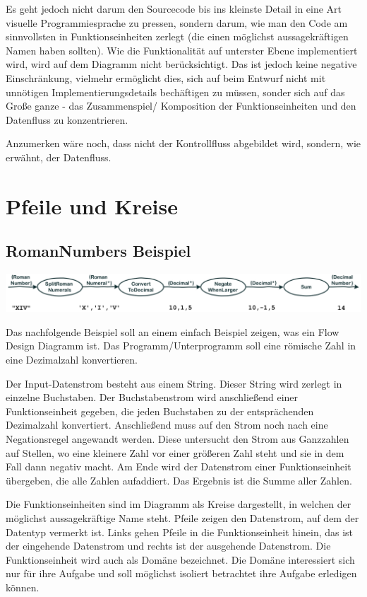 \documentclass[11pt]{article}
\begin{document}
Es geht jedoch nicht darum den Sourcecode bis ins kleinste Detail in eine Art visuelle Programmiesprache zu pressen,
sondern darum, wie man den Code am sinnvollsten in Funktionseinheiten zerlegt (die einen möglichst aussagekräftigen Namen haben sollten).
Wie die Funktionalität auf unterster Ebene implementiert wird, wird auf dem Diagramm nicht berücksichtigt.
Das ist jedoch keine negative Einschränkung, vielmehr ermöglicht dies, sich auf beim Entwurf nicht mit unnötigen Implementierungsdetails bechäftigen zu
müssen, sonder sich auf das Große ganze - das Zusammenspiel/ Komposition der Funktionseinheiten und den Datenfluss zu konzentrieren.

Anzumerken wäre noch, dass nicht der Kontrollfluss abgebildet wird, sondern, wie erwähnt, der Datenfluss.

\section{Pfeile und Kreise}
\label{sec:orgheadline4}
\subsection{RomanNumbers Beispiel}
\label{sec:orgheadline2}

\includegraphics[width=.9\linewidth]{./img/FromRomanNumerals.png}

Das nachfolgende Beispiel soll an einem einfach Beispiel zeigen, was ein Flow Design Diagramm ist.
Das Programm/Unterprogramm soll eine römische Zahl in eine Dezimalzahl konvertieren.

Der Input-Datenstrom besteht aus einem String. Dieser String wird zerlegt in einzelne Buchstaben.
Der Buchstabenstrom wird anschließend einer Funktionseinheit gegeben, die jeden Buchstaben zu der entsprächenden 
Dezimalzahl konvertiert. Anschließend muss auf den Strom noch nach eine Negationsregel angewandt werden. Diese untersucht den
Strom aus Ganzzahlen auf Stellen, wo eine kleinere Zahl vor einer größeren Zahl steht und sie in dem Fall dann negativ macht.
Am Ende wird der Datenstrom einer Funktionseinheit übergeben, die alle Zahlen aufaddiert.
Das Ergebnis ist die Summe aller Zahlen. 

Die Funktionseinheiten sind im Diagramm als Kreise dargestellt, in welchen der möglichst aussagekräftige Name steht.
Pfeile zeigen den Datenstrom, auf dem der Datentyp vermerkt ist.
Links gehen Pfeile in die Funktionseinheit hinein, das ist der eingehende Datenstrom und rechts ist der ausgehende Datenstrom.
Die Funktionseinheit wird auch als Domäne bezeichnet. Die Domäne interessiert sich nur für ihre Aufgabe und soll möglichst isoliert
betrachtet ihre Aufgabe erledigen können.
\end{document}
